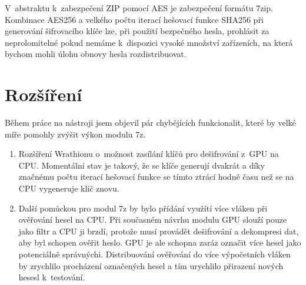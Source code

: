 V~abstraktu k~zabezpečení ZIP pomocí AES je zabezpečení formátu 7zip. Kombinace AES256 a velkého
počtu iterací hešovací funkce SHA256 při generování šifrovacího klíče lze, při použití bezpečného
hesla, prohlásit za neprolomitelné pokud nemáme k~dispozici vysoké množství zařízeních, na která
bychom mohli úlohu obnovy hesla rozdistribuovat.



\section{Rozšíření}
Během práce na nástroji jsem objevil pár chybějících funkcionalit, které by velké míře pomohly
zvýšit výkon modulu 7z.
\begin{enumerate}
   \item Rozšíření Wrathionu o~možnost zasílání klíčů pro dešifrování z~GPU na CPU. Momentální
       stav je takový, že se klíče generují dvakrát a díky značnému počtu iterací hešovací funkce
       se tímto ztrácí hodně času než se na CPU vygeneruje klíč znovu.
    \item Další pomůckou pro modul 7z by bylo přídání využítí více vláken při ověřování hesel na
	CPU. Při současném návrhu modulu GPU slouží pouze jako filtr a CPU ji brzdí, protože musí
	provádět dešifrování a dekompresi dat, aby byl schopen ověřit heslo. GPU je ale schopna
	zaráz označit více hesel jako potenciálně správnýchi. Distribuování ověřování do
	více výpočetních vláken by zrychlilo procházení označených hesel a tím urychlilo
	přirazení nových hesesl k~testování.
\end{enumerate}


